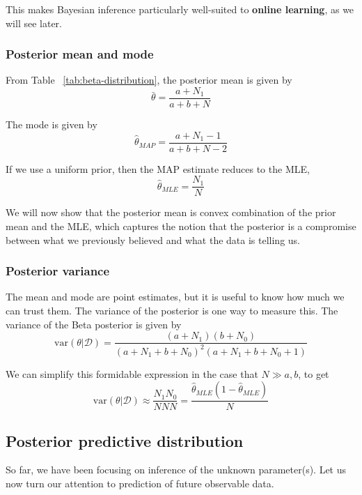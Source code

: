 This makes Bayesian inference particularly well-suited to \textbf{online learning}, as we will see later.

\subsubsection{Posterior mean and mode}
\label{sec:beta-binomial-Posterior-mean-and-mode}
From Table ~\ref{tab:beta-distribution}, the posterior mean is given by
\begin{equation}
\bar{\theta}=\dfrac{a+N_1}{a+b+N}
\end{equation}

The mode is given by
\begin{equation}
\hat{\theta}_{MAP}=\dfrac{a+N_1-1}{a+b+N-2}
\end{equation}

If we use a uniform prior, then the MAP estimate reduces to the MLE,
\begin{equation}
\hat{\theta}_{MLE}=\dfrac{N_1}{N}
\end{equation}

We will now show that the posterior mean is convex combination of the prior mean and the MLE, which captures the notion that the posterior is a compromise between what we previously believed and what the data is telling us.

\subsubsection{Posterior variance}
The mean and mode are point estimates, but it is useful to know how much we can trust them. The variance of the posterior is one way to measure this. The variance of the Beta posterior is given by
\begin{equation}
\text{var}(\theta|\mathcal{D})=\dfrac{(a+N_1)(b+N_0)}{(a+N_1+b+N_0)^2(a+N_1+b+N_0+1)}
\end{equation}

We can simplify this formidable expression in the case that $N \gg a, b$, to get
\begin{equation}
\text{var}(\theta|\mathcal{D}) \approx \dfrac{N_1N_0}{NNN}=\dfrac{\hat{\theta}_{MLE}(1-\hat{\theta}_{MLE})}{N}
\end{equation}


\subsection{Posterior predictive distribution}
So far, we have been focusing on inference of the unknown parameter(s). Let us now turn our attention to prediction of future observable data.

